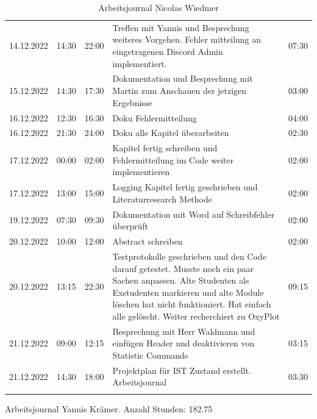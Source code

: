 \documentclass[a4paper, table]{article}
\begin{document}
\begin{longtable}[h]{|l|l|l|p{20em}|l|}
    14.12.2022 & 14:30 & 22:00 & Treffen mit Yannis und Besprechung weiteres   Vorgehen. Fehler mitteilung an eingetragenen Discord Admin implementiert. & 07:30  \\
    15.12.2022 & 14:30 & 17:30 & Dokumentation und Besprechung mit Martin zum Anschauen   der jetzigen Ergebnisse & 03:00  \\
    16.12.2022 & 12:30 & 16:30 & Doku Fehlermitteilung & 04:00 \\
    16.12.2022 & 21:30 & 24:00 & Doku alle Kapitel   überarbeiten & 02:30 \\
    17.12.2022 & 00:00 & 02:00 & Kapitel fertig schreiben und Fehlermitteilung im   Code weiter implementieren & 02:00 \\
    17.12.2022 & 13:00 & 15:00 & Logging Kapitel fertig geschrieben und   Literaturresearch Methode & 02:00 \\
    19.12.2022 & 07:30 & 09:30 & Dokumentation mit Word auf Schreibfehler   überprüft & 02:00 \\
    20.12.2022 & 10:00 & 12:00 & Abstract schreiben & 02:00  \\
    20.12.2022 & 13:15 & 22:30 & Testprotokolle geschrieben und den Code darauf   getestet. Musste noch ein paar Sachen anpassen. Alte Studenten als   Exstudenten markieren und alte Module löschen hat nicht funktioniert. Hat einfach alle   gelöscht. Weiter recherchiert zu OxyPlot & 09:15  \\
    21.12.2022 & 09:00 & 12:15 & Besprechung mit Herr Waldmann und einfügen Header   und deaktivieren von Statistic Commands & 03:15 \\
    21.12.2022 & 14:30 & 18:00 & Projektplan für IST Zustand erstellt.  Arbeitsjournal & 03:30 \\
    \hline
    \caption{Arbeitsjournal Nicolas Wiedmer}
    \label{tab:work-journal-nicolas}
\end{longtable}
\clearpage

Arbeitsjournal Yannis Krämer.
Anzahl Stunden: 182.75
\end{document}

